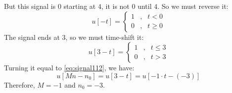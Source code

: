 \documentclass{article}
\begin{document}
But this signal is $0$ starting at $4$, it is not $0$ until $4$. So we must reverse it:
\begin{equation*}
u[-t] =\left\{ \begin{array}{lll} 1 &,& t < 0 \\ 0 &,& t \geq 0\end{array} \right.
\end{equation*}
The signal ends at $3$, so we must time-shift it:
\begin{equation*}
u[3-t] =\left\{ \begin{array}{lll} 1 &,& t \leq 3 \\ 0 &,& t > 3\end{array} \right.
\end{equation*}
Turning it equal to \ref{eq:signal112}, we have:
\begin{equation*}
u[Mn - n_{0}] = u[3-t] = u[-1\cdot t - (-3)]
\end{equation*}
Therefore, $M=-1$ and $n_{0}=-3$.
\end{document}
